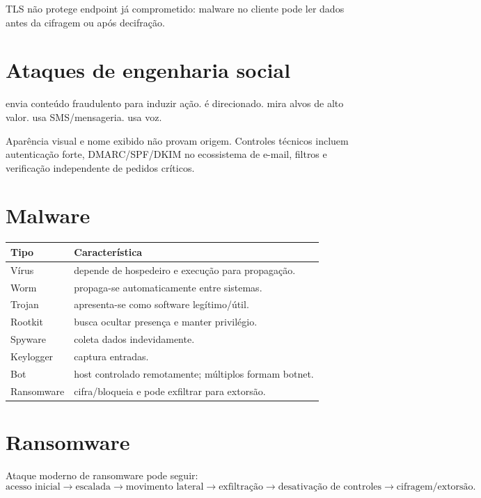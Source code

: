 TLS não protege endpoint já comprometido: malware no cliente pode ler dados antes da cifragem ou após decifração.

\section{Ataques de engenharia social}

 envia conteúdo fraudulento para induzir ação.  é direcionado.  mira alvos de alto valor.  usa SMS/mensageria.  usa voz.

Aparência visual e nome exibido não provam origem. Controles técnicos incluem autenticação forte, DMARC/SPF/DKIM no ecossistema de e-mail, filtros e verificação independente de pedidos críticos.

\section{Malware}

\begin{table}[ht]
\centering
\small
\begin{tabularx}{\textwidth}{l X}
\toprule
Tipo & Característica \\
\midrule
Vírus & depende de hospedeiro e execução para propagação. \\
Worm & propaga-se automaticamente entre sistemas. \\
Trojan & apresenta-se como software legítimo/útil. \\
Rootkit & busca ocultar presença e manter privilégio. \\
Spyware & coleta dados indevidamente. \\
Keylogger & captura entradas. \\
Bot & host controlado remotamente; múltiplos formam botnet. \\
Ransomware & cifra/bloqueia e pode exfiltrar para extorsão. \\
\bottomrule
\end{tabularx}
\end{table}

\section{Ransomware}

Ataque moderno de ransomware pode seguir:
\[
\text{acesso inicial}\rightarrow
\text{escalada}\rightarrow
\text{movimento lateral}\rightarrow
\text{exfiltração}\rightarrow
\text{desativação de controles}\rightarrow
\text{cifragem/extorsão}.
\]

